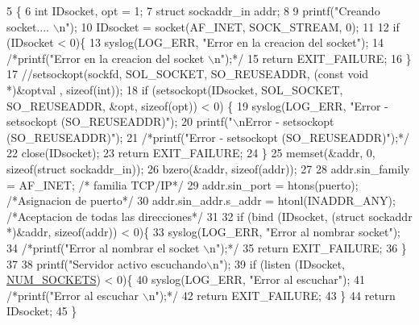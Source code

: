 \begin{DoxyCode}
5                                \{
6         \textcolor{keywordtype}{int} IDsocket, opt = 1;
7         \textcolor{keyword}{struct }sockaddr\_in addr;
8 
9         printf(\textcolor{stringliteral}{"Creando socket.... \(\backslash\)n"});
10         IDsocket = socket(AF\_INET, SOCK\_STREAM, 0);
11 
12         \textcolor{keywordflow}{if} (IDsocket < 0)\{
13                 syslog(LOG\_ERR, \textcolor{stringliteral}{"Error en la creacion del socket"});
14                 \textcolor{comment}{/*printf("Error en la creacion del socket \(\backslash\)n");*/}
15                 \textcolor{keywordflow}{return} EXIT\_FAILURE;
16         \}
17                 \textcolor{comment}{//setsockopt(sockfd, SOL\_SOCKET, SO\_REUSEADDR, (const void *)&optval , sizeof(int));}
18         \textcolor{keywordflow}{if} (setsockopt(IDsocket, SOL\_SOCKET, SO\_REUSEADDR, &opt, \textcolor{keyword}{sizeof}(opt)) < 0) \{
19                 syslog(LOG\_ERR, \textcolor{stringliteral}{"Error - setsockopt (SO\_REUSEADDR)"});
20                 printf(\textcolor{stringliteral}{"\(\backslash\)nError - setsockopt (SO\_REUSEADDR)"});
21                 \textcolor{comment}{/*printf("Error - setsockopt (SO\_REUSEADDR)");*/}
22                 close(IDsocket);
23                 \textcolor{keywordflow}{return} EXIT\_FAILURE;
24         \}
25         memset(&addr, 0, \textcolor{keyword}{sizeof}(\textcolor{keyword}{struct} sockaddr\_in));
26         bzero(&addr, \textcolor{keyword}{sizeof}(addr));
27 
28         addr.sin\_family = AF\_INET; \textcolor{comment}{/* familia TCP/IP*/}
29         addr.sin\_port = htons(puerto); \textcolor{comment}{/*Asignacion de puerto*/}
30         addr.sin\_addr.s\_addr = htonl(INADDR\_ANY); \textcolor{comment}{/*Aceptacion de todas las direcciones*/}
31 
32         \textcolor{keywordflow}{if} (bind (IDsocket, (\textcolor{keyword}{struct} sockaddr *)&addr, \textcolor{keyword}{sizeof}(addr)) < 0)\{
33                 syslog(LOG\_ERR, \textcolor{stringliteral}{"Error al nombrar socket"});
34                 \textcolor{comment}{/*printf("Error al nombrar el socket \(\backslash\)n");*/}
35                 \textcolor{keywordflow}{return} EXIT\_FAILURE;
36         \}
37 
38         printf(\textcolor{stringliteral}{"Servidor activo escuchando\(\backslash\)n"});
39         \textcolor{keywordflow}{if} (listen (IDsocket, \hyperlink{_g-2361-06-_p1-_server_8h_a1c803e4ececfb47d2791c9283c85eb00}{NUM\_SOCKETS}) < 0)\{
40                 syslog(LOG\_ERR, \textcolor{stringliteral}{"Error al escuchar"});
41                 \textcolor{comment}{/*printf("Error al escuchar \(\backslash\)n");*/}
42                 \textcolor{keywordflow}{return} EXIT\_FAILURE;
43         \}
44         \textcolor{keywordflow}{return} IDsocket;
45 \}
\end{DoxyCode}
\hypertarget{_g-2361-06-_p1-_sockets_8h_a172e85f036cff044fd5ba218460115c7}{}
